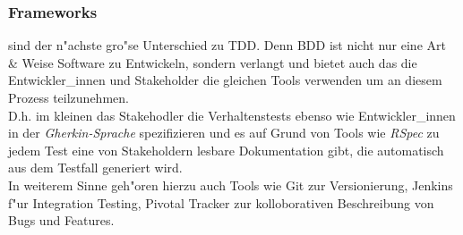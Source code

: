 \documentclass[runningheads,a4paper]{llncs}
\begin{document}
    \subsubsection{Frameworks} sind der n"achste gro"se Unterschied zu TDD. Denn 
      BDD ist nicht nur eine Art \& Weise Software zu Entwickeln, sondern verlangt
      und bietet auch das die Entwickler\_innen und Stakeholder die gleichen
      Tools verwenden um an diesem Prozess teilzunehmen.\\
      D.h. im kleinen das Stakehodler die Verhaltenstests ebenso wie 
      Entwickler\_innen in der {\em Gherkin-Sprache } spezifizieren und es 
      auf Grund von Tools wie {\em RSpec } zu jedem Test eine von Stakeholdern
      lesbare Dokumentation gibt, die automatisch aus dem Testfall generiert wird.\\
      In weiterem Sinne geh"oren hierzu auch Tools wie Git zur Versionierung, 
      Jenkins f"ur Integration Testing, Pivotal Tracker zur kolloborativen 
      Beschreibung von Bugs und Features. 
\end{document}
